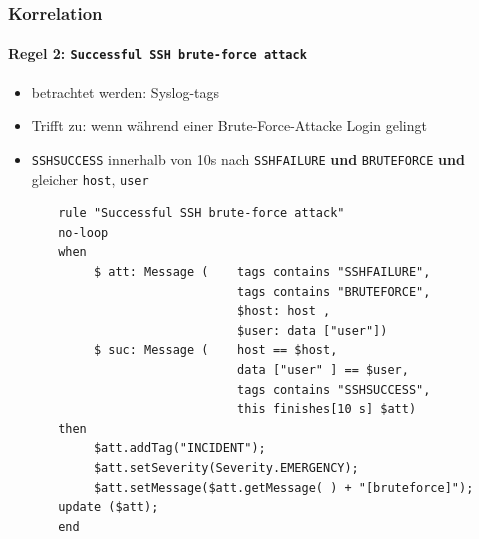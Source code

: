\begin{frame}[fragile]
\frametitle{Korrelation}
\framesubtitle{Regel 2: \texttt{Successful SSH brute-force attack}}

\begin{itemize}
    \item betrachtet werden: Syslog-tags 
    \item Trifft zu: wenn während einer Brute-Force-Attacke Login gelingt
    \item   \texttt{SSHSUCCESS} innerhalb von 10s nach \texttt{SSHFAILURE} \textbf{und}
            \texttt{BRUTEFORCE} \textbf{und} gleicher \texttt{host}, \texttt{user}
\end{itemize}


\begin{center}
    \begin{minipage}{0.7\textwidth}
        \begin{verbatim}
       rule "Successful SSH brute-force attack"
       no-loop
       when
            $ att: Message (    tags contains "SSHFAILURE",
                                tags contains "BRUTEFORCE",
                                $host: host ,
                                $user: data ["user"])
            $ suc: Message (    host == $host,
                                data ["user" ] == $user,
                                tags contains "SSHSUCCESS",
                                this finishes[10 s] $att)
       then
            $att.addTag("INCIDENT");
            $att.setSeverity(Severity.EMERGENCY);
            $att.setMessage($att.getMessage( ) + "[bruteforce]");
       update ($att);
       end
        
        \end{verbatim}
    \end{minipage}
\end{center}

\end{frame}

